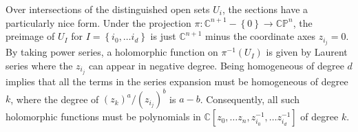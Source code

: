 \documentclass[psamsfonts, 12pt]{amsart}
\newtheorem{thm}{Theorem}[section]
\theoremstyle{definition}
\theoremstyle{remark}
\renewcommand{\O}{\mathcal{O}}
\renewcommand{\C}{\mathbb{C}}
\newcommand{\CP}{\mathbb{CP}}
\newcommand{\inv}{^{-1}}
\newcommand{\set}[1]{\left\lbrace #1 \right\rbrace}
\begin{document}
%
Over intersections of the distinguished open sets $U_i$, the sections have
a particularly nice form. Under the projection $\pi : \C^{n+1}-\set{0} \to \CP^n$,
the preimage of $U_I$ for $I = \set{i_0, \ldots i_d}$ is just $\C^{n+1}$ minus
the coordinate axes $z_{i_j} = 0$. By taking power series, a holomorphic
function on $\pi\inv(U_I)$ is given by Laurent series where the $z_{i_j}$ can appear
in negative degree. Being homogeneous of degree $d$ implies that all the
terms in the series expansion must be homogeneous of degree $k$, where the
degree of $(z_k)^a/(z_{i_j})^b$ is $a - b$. Consequently, all such holomorphic
functions must be polynomials in $\C[z_0, \ldots z_n, z_{i_0}\inv, \ldots z_{i_d}\inv]$
of degree $k$.
\iffalse
We now compute the $n^{th}$ cohomology groups.
%
\begin{thm}
\[
\check{H}^i(\mathcal{U}, \O(k)) = \begin{cases}
\C[z_0, \ldots z_n]_{-k-n-1} & -k-n-1 \geq 0 \\
0 & \text{otherwise}
\end{cases}
\]
\end{thm}
%
\begin{proof}
Since $C^{n+1}(\mathcal{U}, \O(k)) = 0$, we have that
$\check{H}^n(\mathcal{U},\O(k))$ is just the cokernel of the differential
$d : C^{n-1}(\mathcal{U}, \O(k)) \to C^n(\mathcal{U}, \O(k))$.
\end{proof}
\fi
%
%
\end{document}
